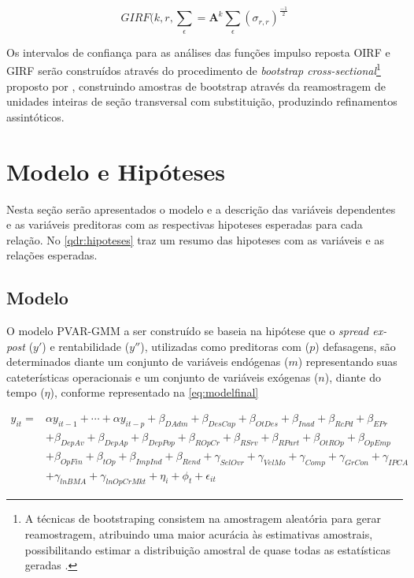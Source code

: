 \documentclass[
  12pt,
  12pt,
  openright,
  oneside,
  a4paper,
  chapter=TITLE,
  section=TITLE,
  subsection=TITLE,
  subsubsection=TITLE,
  english,
  portugues,
  sumario=tradicional]{abntex2}
\begin{document}
\begin{equation}\label{eq:girf}
GIRF(k,r,\sum_{\epsilon} = \mathbf{A}^k\sum_{\epsilon}(\sigma_{r,r})^\frac{-1}{2} 
\end{equation}

Os intervalos de confiança para as análises das funções impulso reposta OIRF e GIRF serão construídos através do procedimento de \emph{bootstrap cross-sectional}\footnote{A técnicas de bootstraping consistem na amostragem aleatória para gerar reamostragem, atribuindo uma maior acurácia às estimativas amostrais, possibilitando estimar a distribuição amostral de quase todas as estatísticas geradas \cite{sigmund:2008}.} proposto por \textcite{kapetanios:2008}, construindo amostras de bootstrap através da reamostragem de unidades inteiras de seção transversal com substituição, produzindo refinamentos assintóticos.

\section{Modelo e Hipóteses}

Nesta seção serão apresentados o modelo e a descrição das variáveis dependentes e as variáveis preditoras com as respectivas hipoteses esperadas para cada relação. No \autoref{qdr:hipoteses} traz um resumo das hipoteses com as variáveis e as relações esperadas.

\subsection{Modelo}

O modelo PVAR-GMM a ser construído se baseia na hipótese que o \emph{spread ex-post} (\(y'\)) e rentabilidade (\(y''\)), utilizadas como preditoras com (\(p\)) defasagens, são determinados diante um conjunto de variáveis endógenas (\(m\)) representando suas cateterísticas operacionais e um conjunto de variáveis exógenas (\(n\)), diante do tempo (\(\eta\)), conforme representado na \autoref{eq:modelfinal}

\begin{equation}\label{eq:modelfinal}
\begin{aligned}
y_{it} = & \alpha y_{it-1}+ \cdots +\alpha y_{it-p} + \beta_{DAdm} +  \beta_{DesCap} + \beta_{OtDes} + \beta_{Inad} + \beta_{RcPd} + \beta_{EPr} \\ 
& + \beta_{DepAv} + \beta_{DepAp} + \beta_{DepPop} + \beta_{ROpCr} + \beta_{RSrv} + \beta_{RPart} + \beta_{OtROp} + \beta_{OpEmp} \\
& + \beta_{OpFin} + \beta_{tOp} + \beta_{ImpInd} + \beta_{Rend} + \gamma_{SelOvr} + \gamma_{VelMo} + \gamma_{Comp} + \gamma_{GrCon} + \gamma_{IPCA}  \\ 
& + \gamma_{lnBMA} + \gamma_{lnOpCrMkt} + \eta_{i} + \phi_{t} + \epsilon_{it}   
\end{aligned}
\end{equation}
\end{document}
